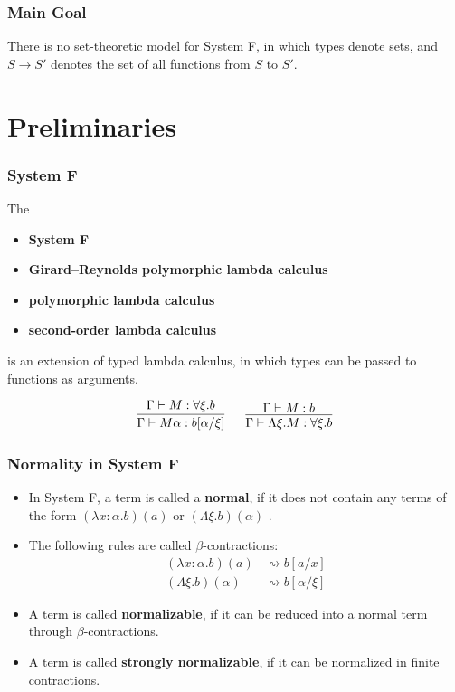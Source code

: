 \begin{frame}[t,plain]
\titlepage
\end{frame}

\begin{frame}[fragile]
    \frametitle{Main Goal}
  
    There is no set-theoretic model for System F, in which types denote sets, and $S \rightarrow S'$ denotes the set of all functions from $S$ to $S'$.
\end{frame}

\section{Preliminaries}

\begin{frame}[fragile]
    \frametitle{System F}
  
    The
    \begin{itemize}
        \item \textbf{System F}
        \item \textbf{Girard--Reynolds polymorphic lambda calculus}
        \item \textbf{polymorphic lambda calculus}
        \item \textbf{second-order lambda calculus}
    \end{itemize}
    is an extension of typed lambda calculus, in which types can be passed to functions as arguments.
  
    $$
    \begin{matrix}
    \infer{\Gamma \vdash M\alpha : b[\alpha/\xi]}{\Gamma \vdash M : \forall\xi.b}
    \ &\ 
    \infer{\Gamma \vdash \Lambda\xi. M : \forall\xi.b}{\Gamma \vdash M : b}
    \end{matrix}
    $$
\end{frame}

\begin{frame}[fragile]
    \frametitle{Normality in System F}
  
    \begin{itemize}
        \item In System F, a term is called a \textbf{normal}, if it does not contain any terms of the form $(\lambda x: \alpha. b)(a)$ or $(\Lambda \xi. b)(\alpha)$  \cite{capretta_valentini_1999}.
        \item The following rules are called $\beta$-contractions:
        \begin{align*}
            (\lambda x: \alpha. b)(a) &\rightsquigarrow b [a/x] \\
            (\Lambda \xi. b)(\alpha) &\rightsquigarrow b [\alpha / \xi]
        \end{align*}
        \item A term is called \textbf{normalizable}, if it can be reduced into a normal term through $\beta$-contractions.
        \item A term is called \textbf{strongly normalizable}, if it can be normalized in finite contractions.
    \end{itemize}
\end{frame}

